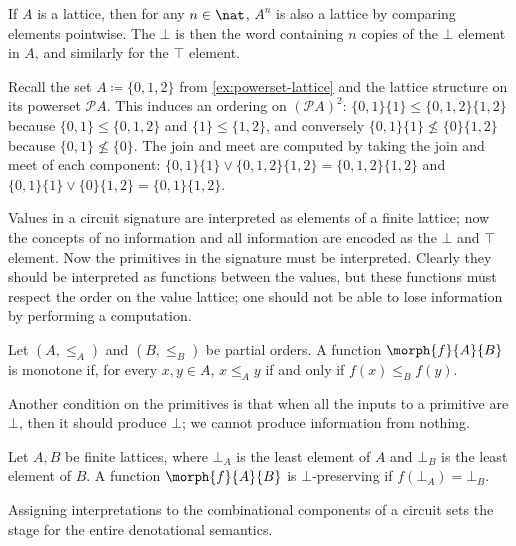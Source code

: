 \begin{remark}
    If \(A\) is a lattice, then for any \(n \in \nat\), \(A^n\) is also a
    lattice by comparing elements pointwise.
    The \(\bot\) is then the word containing \(n\) copies of the \(\bot\)
    element in \(A\), and similarly for the \(\top\) element.

    Recall the set \(A \coloneqq \{0,1,2\}\) from
    \cref{ex:powerset-lattice} and the lattice structure on its powerset
    \(\mathcal{P}A\).
    This induces an ordering on \((\mathcal{P}A)^2\):
    \(\{0,1\}\{1\} \leq \{0,1,2\}\{1,2\}\) because \(\{0,1\} \leq \{0,1,2\}\)
    and \(\{1\} \leq \{1,2\}\), and conversely
    \(\{0,1\}\{1\} \not\leq \{0\}\{1,2\}\) because \(\{0,1\} \not\leq \{0\}\).
    The join and meet are computed by taking the join and meet of each
    component: \(
    \{0,1\}\{1\} \vee \{0,1,2\}\{1,2\} = \{0,1,2\}\{1,2\}
    \) and \(
    \{0,1\}\{1\} \vee \{0\}\{1,2\} = \{0,1\}\{1,2\}
    \).
\end{remark}

Values in a circuit signature are interpreted as elements of a finite
lattice; now the concepts of no information and all information are encoded
as the \(\bot\) and \(\top\) element.
Now the primitives in the signature must be interpreted.
Clearly they should be interpreted as functions between the values, but these
functions must respect the order on the value lattice; one should not be able to
lose information by performing a computation.

\begin{definition}
    Let \((A, \leq_A)\) and \((B, \leq_B)\) be partial orders.
    A function \(\morph{f}{A}{B}\) is monotone if, for every \(x, y \in A\),
    \(x \leq_A y\) if and only if \(f(x) \leq_B f(y)\).
\end{definition}

Another condition on the primitives is that when all the inputs to a primitive
are \(\bot\), then it should produce \(\bot\); we cannot produce information
from nothing.

\begin{definition}
    Let \(A,B\) be finite lattices, where \(\bot_A\) is the least element of
    \(A\) and \(\bot_B\) is the least element of \(B\).
    A function \(\morph{f}{A}{B}\) is \(\bot\)-preserving if
    \(f(\bot_A) = \bot_B\).
\end{definition}

Assigning interpretations to the combinational components of a circuit sets the
stage for the entire denotational semantics.

